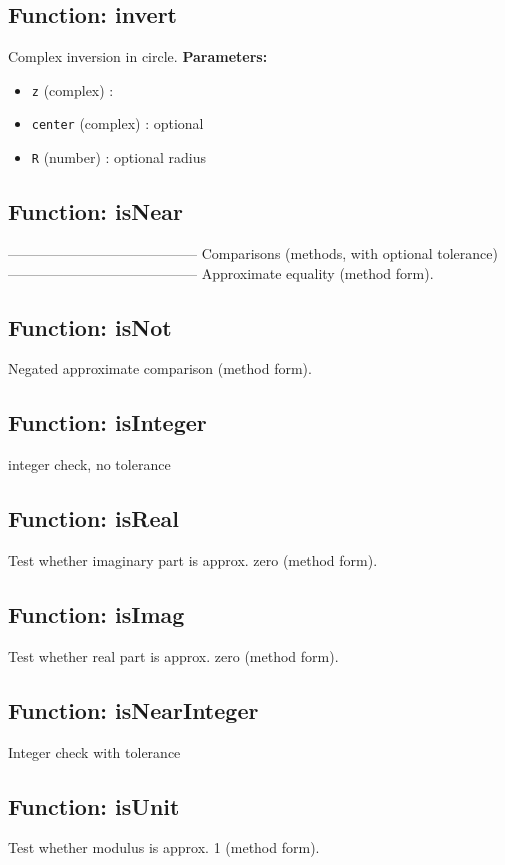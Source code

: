 \documentclass{article}
\begin{document}
\subsection*{Function: invert}
Complex inversion in circle.
\textbf{Parameters:}
\begin{itemize}
\item \texttt{z} (complex) : 
\item \texttt{center} (complex) : optional
\item \texttt{R} (number) : optional radius
\end{itemize}
\hrulefill

\subsection*{Function: isNear}
----------------------------------------- Comparisons (methods, with optional tolerance) ----------------------------------------- Approximate equality (method form).
\hrulefill

\subsection*{Function: isNot}
Negated approximate comparison (method form).
\hrulefill

\subsection*{Function: isInteger}
integer check, no tolerance
\hrulefill

\subsection*{Function: isReal}
Test whether imaginary part is approx. zero (method form).
\hrulefill

\subsection*{Function: isImag}
Test whether real part is approx. zero (method form).
\hrulefill

\subsection*{Function: isNearInteger}
Integer check with tolerance
\hrulefill

\subsection*{Function: isUnit}
Test whether modulus is approx. 1 (method form).
\hrulefill
\end{document}
